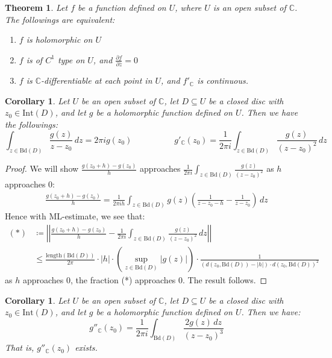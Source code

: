 \documentclass[15pt]{book}
\theoremstyle{break}
\theoremstyle{break}
\newtheorem{thm}{Theorem}[section]
\newtheorem{corT}[lem]{Corollary}
\newcommand{\Int}{\text{Int}}
\newcommand{\Bd}{\text{Bd}}
\newcommand{\Complex}{\mathbb{C}}
\newcommand{\pd}{\partial}
\begin{document}
\begin{thm}
Let $f$ be a function defined on $U$, where $U$ is an open subset of $\Complex$. \\
The followings are equivalent:
\begin{enumerate}[topsep=3pt,itemsep=-1ex,partopsep=1ex,parsep=1ex]
\item $f$ is holomorphic on $U$
\item $f$ is of $C^1$ type on $U$, and $\frac{\pd f}{\pd \bar{z}} = 0$ 
\item $f$ is $\Complex$-differentiable at each point in $U$, and $f'_{\Complex}$ is continuous. 
\end{enumerate}
\end{thm}


\begin{corT}
Let $U$ be an open subset of $\Complex$, let $D\subseteq U$ be a closed disc with $z_0 \in \Int(D)$, and let $g$ be a holomorphic function defined on $U$. Then we have the followings:
$$\int_{z \in \Bd(D)} \frac{g(z)}{z-z_0}\, dz = 2\pi i g(z_0) \quad\qquad\qquad g'_{\Complex}(z_0) = \frac{1}{2\pi i}\int_{z\in \Bd(D)} \frac{g(z)}{(z-z_0)^2}\, dz$$
\end{corT}
\begin{proof}
We will show $\frac{g(z_0+h)-g(z_0)}{h}$ approaches $ \frac{1}{2\pi i}\int_{z\in \Bd(D)} \frac{g(z)}{(z-z_0)^2}$ as $h $ approaches $0$:
\begin{align*}
\frac{g(z_0+h)-g(z_0)}{h}= \frac{1}{2\pi i h}\int_{z\in \Bd(D)} g(z) \left( \frac{1}{z-z_0-h} - \frac{1}{z-z_0}\right)\, dz 
\end{align*}
Hence with ML-estimate, we see that:
\begin{align*}
(*)&\coloneqq  \left|\left|\frac{g(z_0+h)-g(z_0)}{h} -\frac{1}{2\pi i}\int_{z\in \Bd(D)} \frac{g(z)}{(z-z_0)^2}\, dz\right|\right| \\
&\leq \frac{\text{length}(\Bd(D))}{2\pi}\cdot |h|\cdot \left(\sup_{z \in \Bd(D)}|g(z)|\right)\cdot \frac{1}{(d(z_0,\Bd(D)) - |h|) \cdot d(z_0,\Bd(D))^2} 
\end{align*}
as $h$ approaches $0$, the fraction (*) approaches $0$. The result follows.
\end{proof}




\begin{corT}
Let $U$ be an open subset of $\Complex$, let $D\subseteq U$ be a closed disc with $z_0 \in \Int(D)$, and let $g$ be a holomorphic function defined on $U$. Then we have: 
$$g''_{\Complex}(z_0) = \frac{1}{2\pi i}\int_{\Bd(D)} \frac{2g(z)\, dz}{(z-z_0)^3}$$ 
That is, $g''_{\Complex}(z_0)$ exists.
\end{corT}
\end{document}
